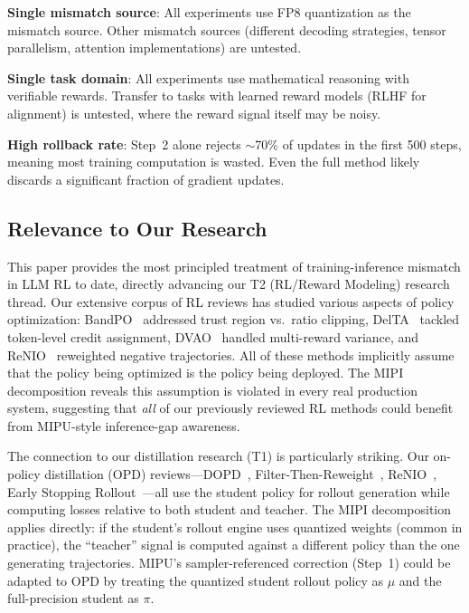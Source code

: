 \documentclass[11pt,a4paper]{article}
\begin{document}
\textbf{Single mismatch source}: All experiments use FP8 quantization as the mismatch source. Other mismatch sources (different decoding strategies, tensor parallelism, attention implementations) are untested.

\textbf{Single task domain}: All experiments use mathematical reasoning with verifiable rewards. Transfer to tasks with learned reward models (RLHF for alignment) is untested, where the reward signal itself may be noisy.

\textbf{High rollback rate}: Step~2 alone rejects $\sim$70\% of updates in the first 500 steps, meaning most training computation is wasted. Even the full method likely discards a significant fraction of gradient updates.

\subsection{Relevance to Our Research}

This paper provides the most principled treatment of training-inference mismatch in LLM RL to date, directly advancing our T2 (RL/Reward Modeling) research thread. Our extensive corpus of RL reviews has studied various aspects of policy optimization: BandPO~\cite{bandpo2026} addressed trust region vs.\ ratio clipping, DelTA~\cite{delta2026} tackled token-level credit assignment, DVAO~\cite{dvao2026} handled multi-reward variance, and ReNIO~\cite{renio2026} reweighted negative trajectories. All of these methods implicitly assume that the policy being optimized is the policy being deployed. The MIPI decomposition reveals this assumption is violated in every real production system, suggesting that \emph{all} of our previously reviewed RL methods could benefit from MIPU-style inference-gap awareness.

The connection to our distillation research (T1) is particularly striking. Our on-policy distillation (OPD) reviews---DOPD~\cite{dopd2026}, Filter-Then-Reweight~\cite{ftr2026}, ReNIO~\cite{renio2026}, Early Stopping Rollout~\cite{esr2026}---all use the student policy for rollout generation while computing losses relative to both student and teacher. The MIPI decomposition applies directly: if the student's rollout engine uses quantized weights (common in practice), the ``teacher'' signal is computed against a different policy than the one generating trajectories. MIPU's sampler-referenced correction (Step~1) could be adapted to OPD by treating the quantized student rollout policy as $\mu$ and the full-precision student as $\pi$.
\end{document}
